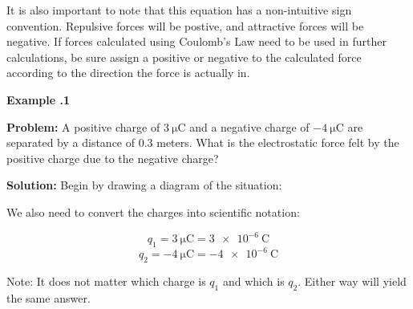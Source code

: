 	 
	
	It is also important to note that this equation has a non-intuitive sign convention.  Repulsive forces will be postive, and attractive forces will be negative.  If forces calculated using Coulomb's Law need to be used in further calculations, be sure assign a positive or negative to the calculated force according to the direction the force is actually in.  
	
	\begin{mdframed}[backgroundcolor=blue!10!white]
		\begin{center}
			
			
			\textbf{Example \thesection.1}	
		\end{center}
		\vspace{0.1in}
		\textbf{Problem: } A positive charge of $\SI{3}{\micro\coulomb}$ and a negative charge of $\SI{-4}{\micro\coulomb}$ are separated by a distance of 0.3 meters.  What is the electrostatic force felt by the positive charge due to the negative charge?
		
		\vspace{0.2in}
		
		
		
		
		
		\textbf{Solution:} 
		Begin by drawing a diagram of the situation: 
		
		
			\begin{center}
			\end{center}			

		We also need to convert the charges into scientific notation:
		
		\begin{equation*}
		q_1 = \SI{3}{\micro\coulomb} = \SI{3e-6}{\coulomb}
		\end{equation*}	
		\begin{equation*}
		q_2 = \SI{-4}{\micro\coulomb} = \SI{-4e-6}{\coulomb}
		\end{equation*}	
		
		Note: It does not matter which charge is $q_1$ and which is $q_2$.  Either way will yield the same answer.  
		

\end{mdframed}
